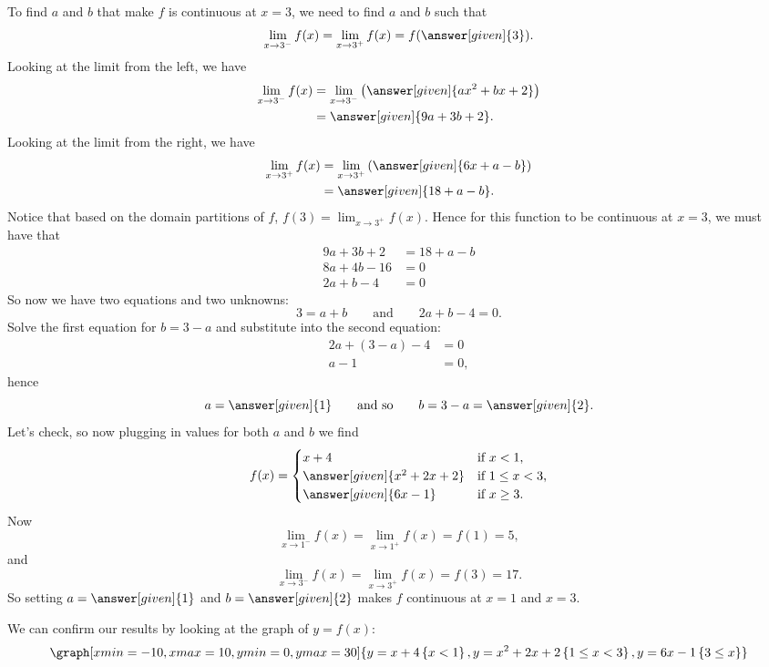 \documentclass{ximera}
\begin{document}
\begin{example}
\begin{explanation}
To find $a$ and $b$ that make $f$ is continuous at $x=3$, we need to
find $a$ and $b$ such that
\[
\lim_{x\to 3^-} f(x) =\lim_{x\to 3^+}f(x) =f(\answer[given]{3}).
\]
Looking at the limit from the left, we have
\begin{align*}
  \lim_{x\to 3^-} f(x) &= \lim_{x\to 3^-} \left(\answer[given]{ax^2+bx+2}\right) \\
  &=\answer[given]{9a + 3b + 2}.
\end{align*}
Looking at the limit from the right, we have
\begin{align*}
  \lim_{x\to 3^+} f(x) &= \lim_{x\to 3^+} \left(\answer[given]{6x+a-b}\right) \\
  &= \answer[given]{18+a-b}.
\end{align*}
Notice that based on the domain partitions of $f$, $f(3)=\lim_{x\to 3^+} f(x)$. Hence for this function to be continuous at $x=3$, we must have that
\begin{align*}
  9a + 3b + 2 &= 18+a-b\\
  8a + 4b -16 &= 0\\
  2a + b -4 &= 0
\end{align*}
So now we have two equations and two unknowns:
\[
 3=a+b \qquad\text{and}\qquad 2a + b -4 = 0.
 \]
 Solve the first equation for $b = 3-a$ and substitute into the second equation:
 \begin{align*}
   2a + (3-a) -4&=0 \\
    a -1&=0,
 \end{align*}
 hence
 \[
 a=\answer[given]{1}\qquad\text{and so}\qquad b =3-a=\answer[given]{2}.
 \]
 Let's check, so now plugging in values for both $a$ and $b$ we find
 \[
 f(x) = 
 \begin{cases}
   x+4 &\text{if $x<1$,}\\
   \answer[given]{x^2+2x+2} &\text{if $1\le x< 3$,}\\
   \answer[given]{6x-1} &\text{if $x\ge 3$.}
\end{cases}
 \]
 Now
 \[
 \lim_{x\to 1^-} f(x) =\lim_{x\to 1^+}f(x) =f(1) =  5,
 \]
 and
 \[
 \lim_{x\to 3^-} f(x) =\lim_{x\to 3^+}f(x) =f(3) = 17.  
 \]
 So setting $a= \answer[given]{1}$ and $b=\answer[given]{2}$ makes $f$ continuous at $x=1$ and $x=3$.
 \begin{onlineOnly}
   We can confirm our results by looking at the graph of $y=f(x)$:
   \[
   \graph[xmin=-10,xmax=10,ymin=0,ymax=30]{y=x+4\left\{x<1\right\},y=x^2+2x+2\left\{1\leq x<3\right\},y=6x-1\left\{3 \leq x\right\}} 
   \]
 \end{onlineOnly}
\end{explanation}
\end{example}
\end{document}
